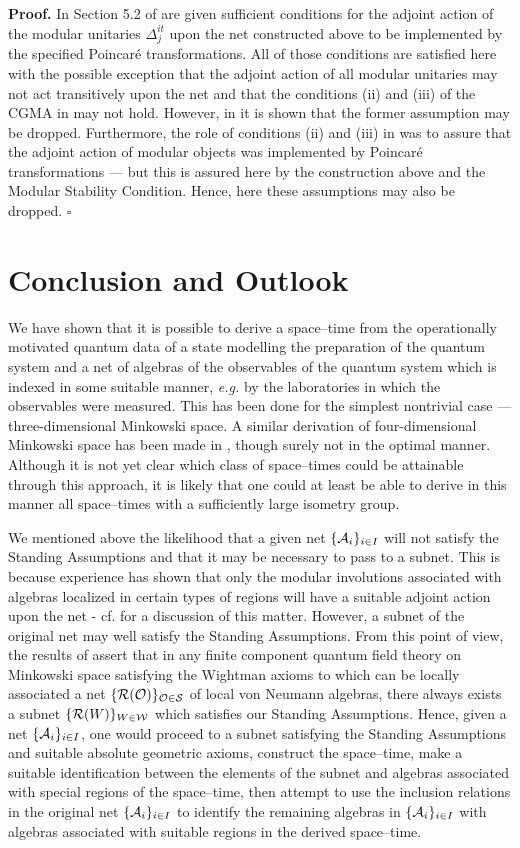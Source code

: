 \documentclass[a4paper,twoside,12pt]{article}
\newenvironment{proof}{\medskip \noindent 
            {\bf Proof.}}{ \hfill $\square$ \medskip}
\def\inet{{\{\As_i \}_{i \in I}}}
\def\wrnet{{\{\Rs(W)\}_{W \in\Ws}}}
\def\rnet{{\{\Rs(\Os)\}_{\Os\in\Ss}}}
\def\msc{{Modular Stability Condition}}
\def\As{{\cal A}}
\def\Os{{\cal O}}
\def\Rs{{\cal R}}
\def\Ss{{\cal S}}
\def\Ws{{\cal W}}
\begin{document}
\begin{proof} In Section 5.2 of \cite{BDFS} are given sufficient 
conditions for the adjoint action of the modular unitaries
$\Delta_j^{it}$ upon the net constructed above to be implemented by
the specified Poincar\'e transformations. All of those conditions are
satisfied here with the possible exception that the adjoint action of
all modular unitaries may not act transitively upon the net and that
the conditions (ii) and (iii) of the CGMA in \cite{BDFS} may not
hold. However, in \cite{BFS2,F} it is shown that the former assumption
may be dropped. Furthermore, the role of conditions (ii) and (iii) in
\cite{BDFS} was to assure that the adjoint action of modular objects
was implemented by Poincar\'e transformations --- but this is assured
here by the construction above and the \msc. Hence, here these
assumptions may also be dropped.
\end{proof}

\section{Conclusion and Outlook}

     We have shown that it is possible to derive a space--time from
the operationally motivated quantum data of a state modelling the
preparation of the quantum system and a net of algebras of the
observables of the quantum system which is indexed in some suitable
manner, {\it e.g.} by the laboratories in which the observables were
measured. This has been done for the simplest nontrivial case ---
three-dimensional Minkowski space.  A similar derivation of
four-dimensional Minkowski space has been made in \cite{Wh}, though
surely not in the optimal manner. Although it is not yet clear which
class of space--times could be attainable through this approach,
it is likely that one could at least be able to derive in this manner
all space--times with a sufficiently large isometry group.

     We mentioned above the likelihood that a given net $\inet$ will
not satisfy the Standing Assumptions and that it may be necessary to
pass to a subnet. This is because experience has shown that only the
modular involutions associated with algebras localized in certain
types of regions will have a suitable adjoint action upon the net -
cf. \cite{BDFS} for a discussion of this matter.  However, a subnet of
the original net may well satisfy the Standing Assumptions. From this
point of view, the results of \cite{BW} assert that in any finite
component quantum field theory on Minkowski space satisfying the
Wightman axioms to which can be locally associated a net $\rnet$ of
local von Neumann algebras, there always exists a subnet $\wrnet$
which satisfies our Standing Assumptions. Hence, given a net $\inet$,
one would proceed to a subnet satisfying the Standing Assumptions and
suitable absolute geometric axioms, construct the space--time,
make a suitable identification between the elements of the subnet and
algebras associated with special regions of the space--time, then
attempt to use the inclusion relations in the original net $\inet$ to
identify the remaining algebras in $\inet$ with algebras associated
with suitable regions in the derived space--time.
\end{document}
